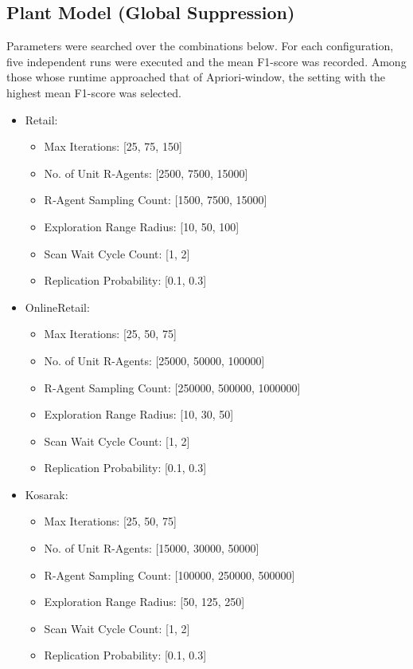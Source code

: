 \subsection{Plant Model (Global Suppression)}
Parameters were searched over the combinations below. For each configuration, five independent runs were executed and the mean F1-score was recorded. Among those whose runtime approached that of Apriori‑window, the setting with the highest mean F1-score was selected.
\begin{itemize}
  \item Retail:
    \begin{itemize}
      \item Max Iterations: [25, 75, 150]
      \item No. of Unit R‑Agents: [2500, 7500, 15000]
      \item R‑Agent Sampling Count: [1500, 7500, 15000]
      \item Exploration Range Radius: [10, 50, 100]
      \item Scan Wait Cycle Count: [1, 2]
      \item Replication Probability: [0.1, 0.3]
    \end{itemize}
  \item OnlineRetail:
    \begin{itemize}
      \item Max Iterations: [25, 50, 75]
      \item No. of Unit R-Agents: [25000, 50000, 100000]
      \item R-Agent Sampling Count: [250000, 500000, 1000000]
      \item Exploration Range Radius: [10, 30, 50]
      \item Scan Wait Cycle Count: [1, 2]
      \item Replication Probability: [0.1, 0.3]
    \end{itemize}
  \item Kosarak:
    \begin{itemize}
      \item Max Iterations: [25, 50, 75]
      \item No. of Unit R-Agents: [15000, 30000, 50000]
      \item R-Agent Sampling Count: [100000, 250000, 500000]
      \item Exploration Range Radius: [50, 125, 250]
      \item Scan Wait Cycle Count: [1, 2]
      \item Replication Probability: [0.1, 0.3]

\end{itemize}
\end{itemize}
